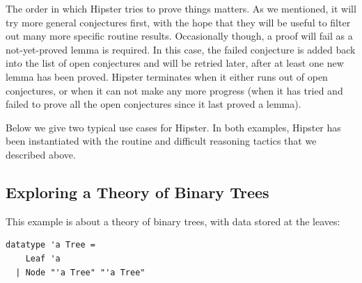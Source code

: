 The order in which Hipster tries to prove things matters. As we
mentioned, it will try more general conjectures first, with the hope
that they will be useful to filter out many more specific routine
results. Occasionally though, a proof will fail as a not-yet-proved
lemma is required. In this case, the failed conjecture is added back
into the list of open conjectures and will be retried later, after at
least one new lemma has been proved. Hipster terminates when it either
runs out of open conjectures, or when it can not make any more
progress (when it has tried and failed to prove all the open
conjectures since it last proved a lemma).

Below we give two typical use cases for Hipster. In both examples,
Hipster has been instantiated with the routine and difficult reasoning
tactics that we described above.

\subsection{Exploring a Theory of Binary Trees}
\label{sec:tree}
This example is about a theory of binary trees, with data stored at the leaves:
\begin{small}
\begin{verbatim}
datatype 'a Tree = 
    Leaf 'a 
  | Node "'a Tree" "'a Tree"
\end{verbatim}
\end{small}

